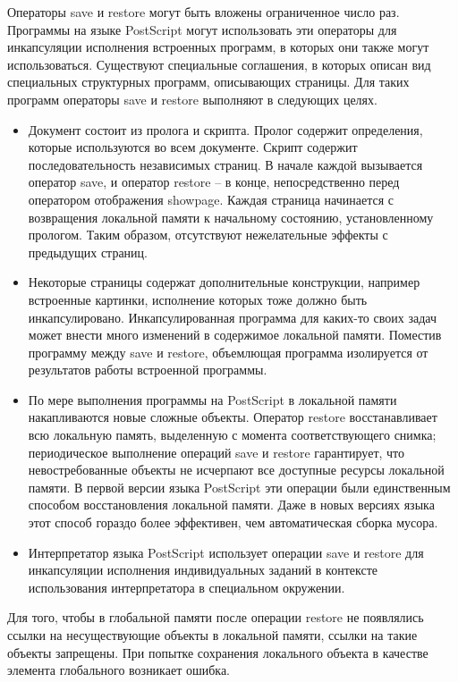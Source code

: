 Операторы save и restore могут быть вложены ограниченное число раз. Программы на языке PostScript могут использовать эти операторы для инкапсуляции исполнения встроенных программ, в которых они также могут использоваться.
Существуют специальные соглашения, в которых описан вид специальных структурных программ, описывающих страницы. Для таких программ операторы save и restore выполняют в следующих целях.
\begin{itemize}
\item Документ состоит из пролога и скрипта. Пролог содержит определения, которые используются во всем документе. Скрипт содержит последовательность независимых страниц. В начале каждой вызывается оператор save, и оператор restore – в конце, непосредственно перед оператором отображения showpage. Каждая страница начинается с возвращения локальной памяти к начальному состоянию, установленному прологом. Таким образом, отсутствуют нежелательные эффекты с предыдущих страниц.
\item Некоторые страницы содержат дополнительные конструкции, например встроенные картинки, исполнение которых тоже должно быть инкапсулировано. Инкапсулированная программа для каких-то своих задач может внести много изменений в содержимое локальной памяти. Поместив программу между save и restore, объемлющая программа  изолируется от результатов работы встроенной программы.
\item По мере выполнения программы на PostScript в локальной памяти накапливаются новые сложные объекты. Оператор restore восстанавливает всю локальную память, выделенную с момента соответствующего снимка; периодическое выполнение операций save и restore гарантирует, что невостребованные объекты не исчерпают все доступные ресурсы локальной памяти. В первой версии языка PostScript эти операции были единственным способом восстановления локальной памяти. Даже в новых версиях языка этот способ гораздо более эффективен, чем автоматическая сборка мусора.
\item Интерпретатор языка PostScript использует операции save и restore для инкапсуляции исполнения индивидуальных заданий в контексте использования интерпретатора в специальном окружении.
\end{itemize}

Для того, чтобы в глобальной памяти после операции restore не появлялись ссылки на несуществующие объекты в локальной памяти, ссылки на такие объекты запрещены. При попытке сохранения локального объекта в качестве элемента глобального возникает ошибка.


